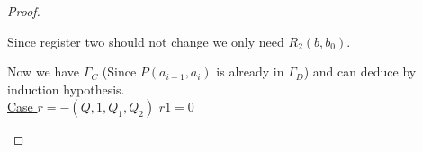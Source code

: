 \begin{proof}
\begin{figure}[H]

\end{figure}
Since register two should not change we only need $R_2(b,b_0)$.

\begin{figure}[H]

\end{figure}
Now we have $\Gamma_C$ (Since $P(a_{i-1},a_i)$ is already in $\Gamma_D$) and can deduce \false{} by induction hypothesis.\\
\underline{Case $r=-(Q,1,Q_1,Q_2)$}
$r1=0$

\begin{figure}[H]

\end{figure}
\end{proof}